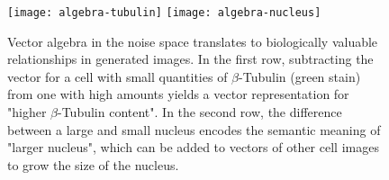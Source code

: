 \documentclass{article}
\begin{document}
\begin{figure}
  \centering
  \texttt{[image: algebra-tubulin]}
  \texttt{[image: algebra-nucleus]}
  \caption{Vector algebra in the noise space translates to biologically valuable relationships in generated images. In the first row, subtracting the vector for a cell with small quantities of $\beta$-Tubulin (green stain) from one with high amounts yields a vector representation for "higher $\beta$-Tubulin content". In the second row, the difference between a large and small nucleus encodes the semantic meaning of "larger nucleus", which can be added to vectors of other cell images to grow the size of the nucleus.}
  \label{fig:algebra}
\end{figure}
\end{document}
